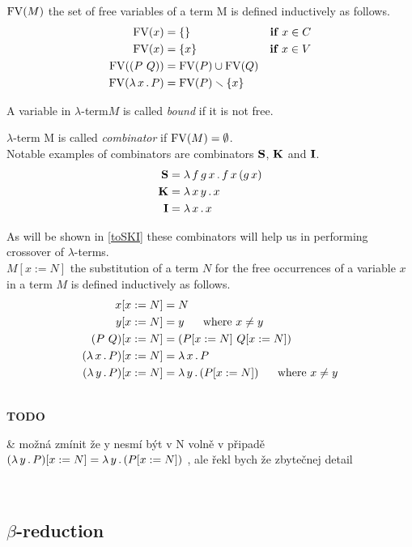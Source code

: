 \documentclass[12pt,a4paper]{report}
\newcommand{\lterm}{$\lambda$-term\xspace}
\newcommand{\lterms}{$\lambda$-terms\xspace}
\newenvironment{todo}
{ ~\\[0.5em]
  {\color{red}\textbf{TODO}}
  \begin{easylist}[itemize]}
{ \end{easylist}
  ~}
\begin{document}
$\mathop{\mathrm{FV}}(M)$ the set of free variables of a term M is defined inductively as follows.
\begin{align*}
\mathop{\mathrm{FV}}(x)          &= \{\}                        &\textbf{if } x \in C  \\
\mathop{\mathrm{FV}}(x)          &= \{x\}                       &\textbf{if } x \in V  \\
\mathop{\mathrm{FV}}((P~Q))      &= \mathop{\mathrm{FV}}(P) \cup \mathop{\mathrm{FV}}(Q)          &          \\
\mathop{\mathrm{FV}}(\lambda \, x \, . \, P) &= \mathop{\mathrm{FV}}(P) \smallsetminus \{x\} &
\end{align*}

A variable in \lterm $M$ is called \textit{bound} if it is not free.

\lterm M is called \textit{combinator} if $\mathop{\mathrm{FV}}(M)=\emptyset$.\\


Notable examples of combinators are combinators
$\mathbf{S}$, $\mathbf{K}$ and $\mathbf{I}$.
\begin{align*}
\mathbf{S} &= \lambda \, f\,g\,x \, . \, f\,x\,(g\,x) \\
\mathbf{K} &= \lambda \, x\,y \, . \, x \\
\mathbf{I} &= \lambda \, x \, . \, x 
\end{align*}

As will be shown in \ref{toSKI}
these combinators will help us in performing crossover of \lterms.\\

$M[x:=N]$ the substitution of a term $N$ for the free occurrences of 
a variable $x$ in a term $M$ is defined inductively as follows.
\begin{align*}
x[x:=N]           &= N \\
y[x:=N]           &= y \text{ ~~~~where } x \not= y  \\
(P~Q)[x:=N]       &= ( P[x:=N]  ~ Q[x:=N] ) \\
( \lambda \, x \, . \, P )[x:=N] &= \lambda \, x \, . \, P\\
( \lambda \, y \, . \, P )[x:=N] &= \lambda \, y \, . \, ( P[x:=N] ) \text{ ~~~~where } x \not= y
\end{align*}




\begin{todo}
& možná zmínit že y nesmí být v N volně v připadě\\
  $( \lambda \, y \, . \, P )[x:=N] = \lambda \, y \, . \, ( P[x:=N] )$ , 
  ale řekl bych že zbytečnej detail
\end{todo}


\subsection{$\beta$-reduction}
\end{document}

